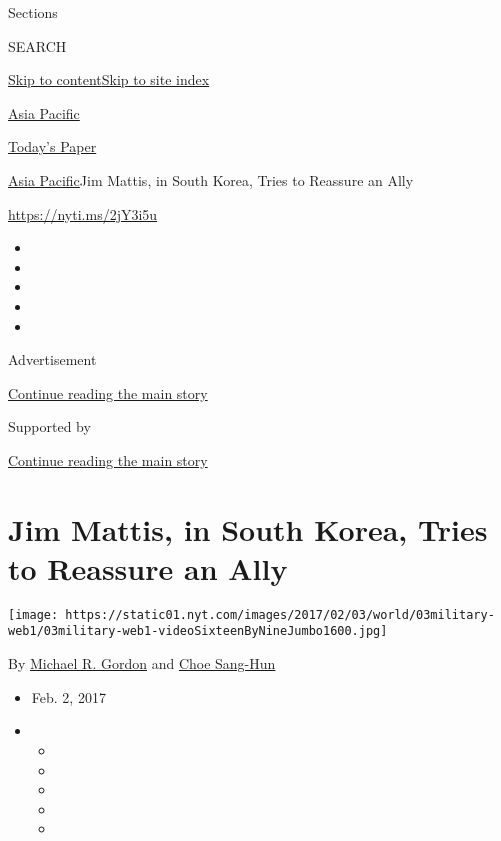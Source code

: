 Sections

SEARCH

\protect\hyperlink{site-content}{Skip to
content}\protect\hyperlink{site-index}{Skip to site index}

\href{https://www.nytimes.com/section/world/asia}{Asia Pacific}

\href{https://myaccount.nytimes.com/auth/login?response_type=cookie\&client_id=vi}{}

\href{https://www.nytimes.com/section/todayspaper}{Today's Paper}

\href{/section/world/asia}{Asia Pacific}\textbar{}Jim Mattis, in South
Korea, Tries to Reassure an Ally

\url{https://nyti.ms/2jY3i5u}

\begin{itemize}
\item
\item
\item
\item
\item
\end{itemize}

Advertisement

\protect\hyperlink{after-top}{Continue reading the main story}

Supported by

\protect\hyperlink{after-sponsor}{Continue reading the main story}

\hypertarget{jim-mattis-in-south-korea-tries-to-reassure-an-ally}{%
\section{Jim Mattis, in South Korea, Tries to Reassure an
Ally}\label{jim-mattis-in-south-korea-tries-to-reassure-an-ally}}

\texttt{[image: https://static01.nyt.com/images/2017/02/03/world/03military-web1/03military-web1-videoSixteenByNineJumbo1600.jpg]}

By \href{http://www.nytimes.com/by/michael-r-gordon}{Michael R. Gordon}
and \href{http://www.nytimes.com/by/choe-sang-hun}{Choe Sang-Hun}

\begin{itemize}
\item
  Feb. 2, 2017
\item
  \begin{itemize}
  \item
  \item
  \item
  \item
  \item
  \end{itemize}
\end{itemize}

